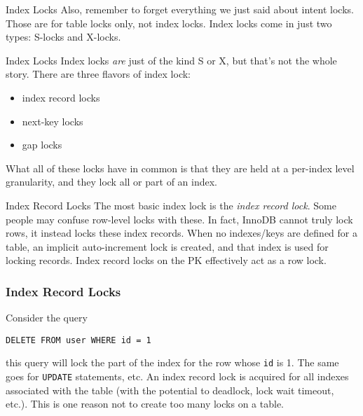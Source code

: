 \documentclass[14pt]{beamer}
\begin{document}
\begin{frame}{Index Locks}
  Also, remember to forget everything we just said about intent locks. Those are
  for table locks only, not index locks.
  \newline
  \newline
  Index locks come in just two types: S-locks and X-locks.
\end{frame}

\begin{frame}{Index Locks}
  Index locks \emph{are} just of the kind S or X, but that's not the whole
  story. There are three flavors of index lock:
  \begin{itemize}
    \item index record locks
    \item next-key locks
    \item gap locks
  \end{itemize}
  What all of these locks have in common is that they are held at a per-index
  level granularity, and they lock all or part of an index.
\end{frame}

\begin{frame}{Index Record Locks}
  The most basic index lock is the \emph{index record lock}. Some people may
  confuse row-level locks with these. In fact, InnoDB cannot truly lock rows, it
  instead locks these index records.
  \newline
  \newline
  When no indexes/keys are defined for a table, an implicit auto-increment lock
  is created, and that index is used for locking records. Index record locks on
  the PK effectively act as a row lock.
\end{frame}

\begin{frame}[fragile]
  \frametitle{Index Record Locks}
  Consider the query
\begin{verbatim}
DELETE FROM user WHERE id = 1
\end{verbatim}
  this query will lock the part of the index for the row whose \texttt{id} is
  1. The same goes for \texttt{UPDATE} statements, etc.
  \newline
  \newline
  An index record lock is acquired for all indexes associated with the table
  (with the potential to deadlock, lock wait timeout, etc.). This is one reason
  not to create too many locks on a table.
\end{frame}
\end{document}
